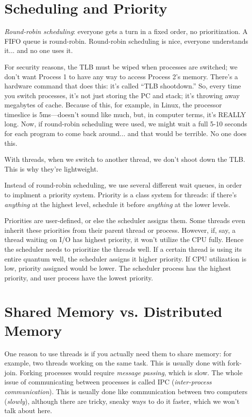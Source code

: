 \documentclass[twoside]{article}
\begin{document}
\section{Scheduling and Priority}

\textit{Round-robin scheduling}: everyone gets a turn in a fixed order, no prioritization. A FIFO queue is round-robin. Round-robin scheduling is nice, everyone understands it... and no one uses it.

For security reasons, the TLB must be wiped when processes are switched; we don't want Process 1 to have any way to access Process 2's memory. There's a hardware command that does this: it's called ``TLB shootdown.'' So, every time you switch processes, it's not just storing the PC and stack; it's throwing away megabytes of cache. Because of this, for example, in Linux, the processor timeslice is 5ms---doesn't sound like much, but, in computer terms, it's REALLY long. Now, if round-robin scheduling were used, we might wait a full 5-10 seconds for each program to come back around... and that would be terrible. No one does this.

With threads, when we switch to another thread, we don't shoot down the TLB. This is why they're lightweight.

Instead of round-robin scheduling, we use several different wait queues, in order to implment a priority system. Priority is a class system for threads: if there's \textit{anything} at the highest level, schedule it before \textit{anything} at the lower levels.

Priorities are user-defined, or else the scheduler assigns them. Some threads even inherit these priorities from their parent thread or process. However, if, say, a thread waiting on I/O has highest priority, it won’t utilize the CPU fully. Hence the scheduler needs to prioritize the threads well. If a certain thread is using its entire quantum well, the scheduler assigns it higher priority. If CPU utilization is low, priority assigned would be lower. The scheduler process has the highest priority, and user process have the lowest priority. 

\section{Shared Memory vs. Distributed Memory}

One reason to use threads is if you actually need them to share memory: for example, two threads working on the same task. This is usually done with fork-join. Forking processes would require \textit{message passing}, which is slow. The whole issue of communicating between processes is called IPC (\textit{inter-process communication}). This is usually done like communication between two computers (\emph{slowly}), although there are tricky, sneaky ways to do it faster, which we won't talk about here.
\end{document}
